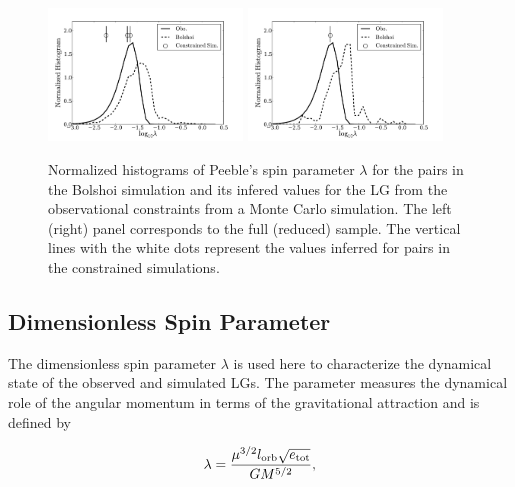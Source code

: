 \documentclass{emulateapj}
\begin{document}
\begin{figure}
\begin{center}
\includegraphics[keepaspectratio=true,width=0.46\textwidth]{./figures/test_lambda_BDM.pdf}
\includegraphics[keepaspectratio=true,width=0.46\textwidth]{./figures/test_lambda_BDM_narrow.pdf}
\caption{{\rm \label{fig:lambda} Normalized histograms of Peeble's
    spin parameter $\lambda$ for the pairs in the Bolshoi simulation
    and its infered values for the LG from the observational
    constraints from a Monte Carlo simulation. The left (right) panel
    corresponds to the full (reduced) sample. The vertical lines with
    the white dots   represent the values inferred for pairs in the
    constrained 
    simulations.}} 
\label{fig:lambda}
\end{center}
\end{figure}



\subsection{Dimensionless Spin Parameter}

The dimensionless 
spin parameter $\lambda$ \citep{Peebles1971} is used here to
characterize the dynamical state of the observed and simulated
LGs. The parameter measures the dynamical role of the angular momentum
in terms of the gravitational attraction and is defined by 

\begin{equation}
\lambda = \frac{\mu^{3/2} l_{\rm orb} \sqrt{e_{\rm tot}}}{G M^{5/2}}, 
\end{equation}
\end{document}

